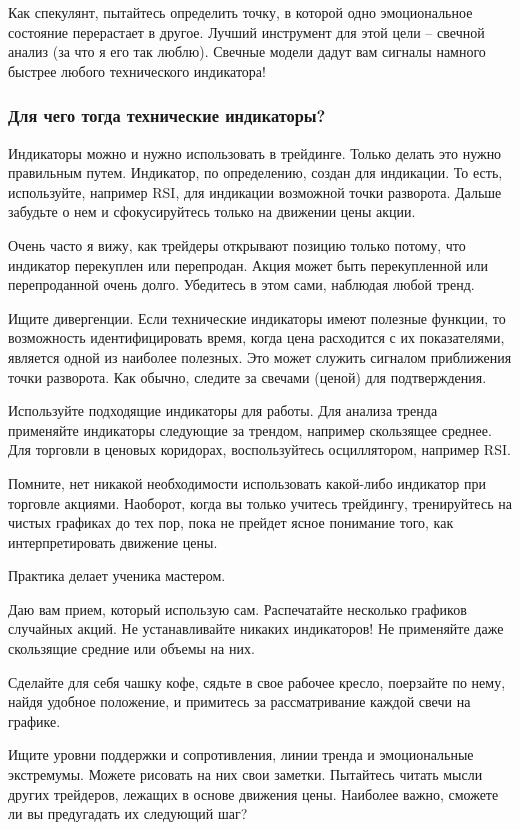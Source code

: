 \documentclass[a5paper]{article}
\begin{document}
Как спекулянт, пытайтесь определить точку, в которой одно
эмоциональное состояние перерастает в другое. Лучший инструмент для
этой цели – свечной анализ (за что я его так люблю). Свечные модели
дадут вам сигналы намного быстрее любого технического индикатора!

\subsubsection{Для чего тогда технические индикаторы?}

Индикаторы можно и нужно использовать в трейдинге. Только делать это нужно правильным путем. Индикатор, по определению, создан для индикации. То есть, используйте, например RSI, для индикации возможной точки разворота. Дальше забудьте о нем и сфокусируйтесь только на движении цены акции.

Очень часто я вижу, как трейдеры открывают позицию только потому, что индикатор перекуплен или перепродан. Акция может быть перекупленной или перепроданной очень долго. Убедитесь в этом сами, наблюдая любой тренд.

Ищите дивергенции. Если технические индикаторы имеют полезные функции, то возможность идентифицировать время, когда цена расходится с их показателями, является одной из наиболее полезных. Это может служить сигналом приближения точки разворота. Как обычно, следите за свечами (ценой) для подтверждения.

Используйте подходящие индикаторы для работы. Для анализа тренда применяйте индикаторы следующие за трендом, например скользящее среднее. Для торговли в ценовых коридорах, воспользуйтесь осциллятором, например RSI.

Помните, нет никакой необходимости использовать какой-либо индикатор при торговле акциями. Наоборот, когда вы только учитесь трейдингу, тренируйтесь на чистых графиках до тех пор, пока не прейдет ясное понимание того, как интерпретировать движение цены.

Практика делает ученика мастером.

Даю вам прием, который использую сам. Распечатайте несколько графиков случайных акций. Не устанавливайте никаких индикаторов! Не применяйте даже скользящие средние или объемы на них.

Сделайте для себя чашку кофе, сядьте в свое рабочее кресло, поерзайте по нему, найдя удобное положение, и примитесь за рассматривание каждой свечи на графике.

Ищите уровни поддержки и сопротивления, линии тренда и эмоциональные экстремумы. Можете рисовать на них свои заметки. Пытайтесь читать мысли других трейдеров, лежащих в основе движения цены. Наиболее важно, сможете ли вы предугадать их следующий шаг?
\end{document}
